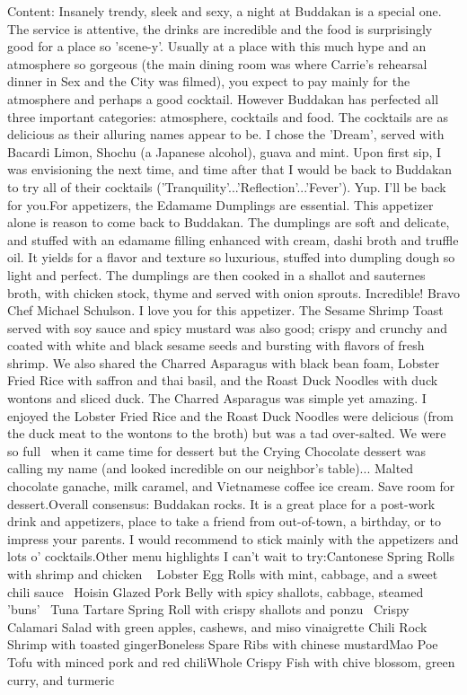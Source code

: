 \documentclass[paper=a4, fontsize=11pt]{jhwhw} %
\begin{document}
\begin{itemize}
\begin{enumerate}
                Content: Insanely trendy, sleek and sexy, a night at Buddakan is a special one. The service is attentive, the drinks are incredible and the food is surprisingly good for a place so 'scene-y'. Usually at a place with this much hype and an atmosphere so gorgeous (the main dining room was where Carrie's rehearsal dinner in Sex and the City was filmed), you expect to pay mainly for the atmosphere and perhaps a good cocktail. However Buddakan has perfected all three important categories: atmosphere, cocktails and food. The cocktails are as delicious as their alluring names appear to be. I chose the 'Dream', served with Bacardi Limon, Shochu (a Japanese alcohol), guava and mint. Upon first sip, I was envisioning the next time, and time after that I would be back to Buddakan to try all of their cocktails ('Tranquility'...'Reflection'...'Fever'). Yup. I'll be back for you.For appetizers, the Edamame Dumplings are essential. This appetizer alone is reason to come back to Buddakan. The dumplings are soft and delicate, and stuffed with an edamame filling enhanced with cream, dashi broth and truffle oil. It yields for a flavor and texture so luxurious, stuffed into dumpling dough so light and perfect. The dumplings are then cooked in a shallot and sauternes broth, with chicken stock, thyme and served with onion sprouts. Incredible! Bravo Chef Michael Schulson. I love you for this appetizer. The Sesame Shrimp Toast served with soy sauce and spicy mustard was also good; crispy and crunchy and coated with white and black sesame seeds and bursting with flavors of fresh shrimp. We also shared the Charred Asparagus with black bean foam, Lobster Fried Rice with saffron and thai basil, and the Roast Duck Noodles with duck wontons and sliced duck. The Charred Asparagus was simple yet amazing. I enjoyed the Lobster Fried Rice and the Roast Duck Noodles were delicious (from the duck meat to the wontons to the broth) but was a tad over-salted. We were so full  when it came time for dessert but the Crying Chocolate dessert was calling my name (and looked incredible on our neighbor's table)... Malted chocolate ganache, milk caramel, and Vietnamese coffee ice cream. Save room for dessert.Overall consensus: Buddakan rocks. It is a great place for a post-work drink and appetizers, place to take a friend from out-of-town, a birthday, or to impress your parents. I would recommend to stick mainly with the appetizers and lots o' cocktails.Other menu highlights I can't wait to try:Cantonese Spring Rolls with shrimp and chicken   Lobster Egg Rolls with mint, cabbage, and a sweet chili sauce  Hoisin Glazed Pork Belly with spicy shallots, cabbage, steamed 'buns'  Tuna Tartare Spring Roll with crispy shallots and ponzu  Crispy Calamari Salad with green apples, cashews, and miso vinaigrette Chili Rock Shrimp with toasted gingerBoneless Spare Ribs with chinese mustardMao Poe Tofu with minced pork and red chiliWhole Crispy Fish with chive blossom, green curry, and turmeric

\end{enumerate}
\end{itemize}
\end{document}
